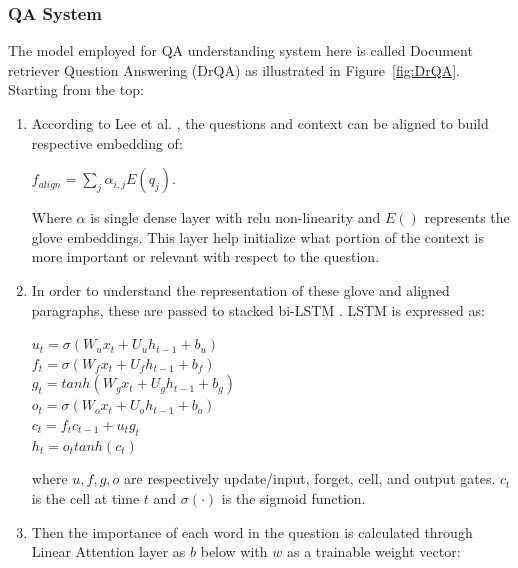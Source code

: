 \subsubsection{QA System}


The model employed for QA understanding system here is called Document retriever Question Answering (DrQA) as illustrated in Figure~\ref{fig:DrQA}.  Starting from the top:
\begin{enumerate}[start=1,label={\bfseries\arabic*:}]
    \item According to Lee et al. \cite{Lee}, the questions and context can be aligned to build respective embedding of:     \vspace{5pt}

    \begin{center} $f_{align} = \sum_j \alpha_{i, j} E(q_j)$. \end{center}
    \vspace{5pt}
    Where $\alpha$ is single dense layer with relu non-linearity and $E()$ represents the glove embeddings. This layer help initialize what portion of the context is more important or relevant with respect to the question.
    
    \item In order to understand the representation of these glove and aligned paragraphs, these are passed to stacked bi-LSTM \cite{biLSTM}. LSTM is expressed as: 
    \vspace{5pt}
    \begin{center}
    $u_t = \sigma(W_u x_t + U_u h_{t-1} + b_u)$ \\
    $f_t = \sigma(W_f x_t + U_f h_{t-1} + b_f)$  \\
    $g_t = tanh(W_g x_t + U_g h_{t-1} + b_g)$  \\
    $o_t = \sigma(W_o x_t + U_o h_{t-1} + b_o)$  \\
    $c_t = f_t c_{t-1} + u_t g_t$ \\
    $h_t = o_t tanh(c_t)$
    \end{center}
        \vspace{5pt}

    where $u, f, g, o$ are  respectively update/input, forget, cell, and output gates. $c_t$ is the cell at time $t$ and $\sigma(\cdot)$ is the sigmoid function. 
    
    \item Then the importance of each word in the question is calculated through Linear Attention layer as $b$ below with $w$ as a trainable weight vector:
        \vspace{5pt}


\end{enumerate}
